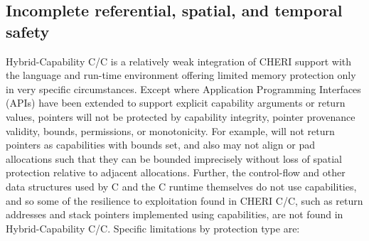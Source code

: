 \documentclass[12pt,twoside,openright,a4paper]{article}
\newcommand{\ccode}[1]{{\small\ttfamily{#1}}}
\newcommand{\cfunc}[1]{{\ccode{#1()}}}
\newcommand{\note}[2]{{\color{blue}[ Note: #1 - #2]}}
\renewcommand{\note}[2]{\relax\ifhmode\unskip\fi}
\newcommand{\jhbnote}[1]{\note{#1}{John B.}}
\newcommand*{\cpp}{\texorpdfstring{C\textsmaller[2]{\protect\nolinebreak[4]\hspace{-.05em}\raisebox{.45ex}{\textbf{++}}}}{C++}}
\newcommand*{\COrCpp}{C/\cpp{}}
\newcommand*{\purecapCOrCpp}{CHERI \COrCpp{}}
\newcommand*{\hybridCOrCpp}{Hybrid-Capability \COrCpp{}}
\begin{document}
\jhbnote{Somewhere we should perhaps point out that existing hybrid
  ABIs don't try to ``respect'' DDC.  In particular, as far as I am
  aware, \ccode{mmap()} will happily return integer pointers that are
  out of bounds of DDC if userland has constrained its DDC.  I think
  the expectation is that if hybrid userland wants to modify DDC, it
  has to wrap system calls, etc.}

\subsection{Incomplete referential, spatial, and temporal safety}

\hybridCOrCpp{} is a relatively weak integration of CHERI support with
the language and run-time environment offering limited memory protection only
in very specific circumstances.
Except where Application Programming Interfaces (APIs) have been extended to
support explicit capability arguments or return values, pointers will not
be protected by capability integrity, pointer provenance validity, bounds,
permissions, or monotonicity.
For example, \cfunc{malloc} will not return pointers as capabilities with
bounds set, and also may not align or pad allocations such that they can be
bounded imprecisely without loss of spatial protection relative to adjacent
allocations.
Further, the control-flow and other data structures used by C and the C
runtime themselves do not use capabilities, and so some of the resilience to
exploitation found in \purecapCOrCpp{}, such as return addresses and stack
pointers implemented using capabilities, are not found in \hybridCOrCpp{}.
Specific limitations by protection type are:
\end{document}
